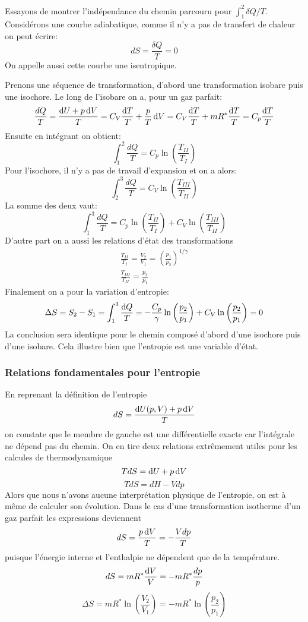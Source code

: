 Essayons de montrer l'indépendance du chemin parcouru
pour $\int_1^2 \delta Q/T$.
Considérons une courbe adiabatique,
comme il n'y a pas de transfert de chaleur on peut écrire:
\[ dS = \frac{\delta Q}{T} = 0 \]
On appelle aussi cette courbe une isentropique.

Prenons une séquence de transformation,
d'abord une transformation isobare puis une isochore.
Le long de l'isobare on a, pour un gaz parfait:
\[ \frac{dQ}{T} = \frac{\operatorname{d}\! U+p\operatorname{d}\! V}{T} =
C_V \frac{\operatorname{d}\! T}{T}+\frac pT\operatorname{d}\! V =
C_V \frac{\operatorname{d}\! T}T+mR^*\frac{\operatorname{d}\! T}T = C_p\frac{\operatorname{d}\! T}T \]
Ensuite en intégrant on obtient:
\[ \int_1^2 \frac{dQ}T = C_p \ln \left (\frac{T_{II}}{T_{I}}\right) \]
Pour l'isochore, il n'y a pas de travail d'expansion et on a alors:
\[ \int_2^3 \frac{dQ}T = C_V \ln \left (\frac{T_{III}}{T_{II}}\right) \]
La somme des deux vaut:
\[ \int_1^3 \frac{dQ}T = C_p \ln \left (\frac{T_{II}}{T_{I}}\right)+
C_V \ln \left (\frac{T_{III}}{T_{II}}\right) \]
D'autre part on a aussi les relations d'état des transformations
\begin{align*}
  \frac{T_{II}}{T_I} = \frac{V_2}{V_1} =
  \left(\frac{p_1}{p_2}\right)^{1/\gamma}\\
  \frac{T_{III}}{T_{II}} = \frac {p_2}{p_1}
\end{align*}
Finalement on a pour la variation d'entropie:
\[ \Delta S = S_2-S_1 = \int_1^3 \frac{\operatorname{d}\! Q}T =
-\frac{C_p}{\gamma} \ln \left(\frac{p_2}{p_1}\right) +
C_V \ln \left (\frac{p_2}{p_1}\right) = 0 \]
La conclusion sera identique pour le chemin composé d'abord
d'une isochore puis d'une isobare.
Cela illustre bien que l'entropie est une variable d'état.

\subsubsection{Relations fondamentales pour l'entropie}
En reprenant la définition de l'entropie
\[ dS = \frac{\operatorname{d}\! U(p,V)+p\operatorname{d}\! V}{T} \]
on constate que le membre de gauche est une différentielle exacte
car l'intégrale ne dépend pas du chemin.
On en tire deux relations extrêmement utiles
pour les calcules de thermodynamique
\[ TdS = \operatorname{d}\! U+p\operatorname{d}\! V \]
\[ TdS = dH-Vdp \]
Alors que nous n'avons aucune interprétation physique de l'entropie,
on est à même de calculer son évolution.
Dans le cas d'une transformation isotherme
d'un gaz parfait les expressions deviennent
\[ dS = \frac{p\operatorname{d}\! V}{T} = -\frac{Vdp}{T} \]
puisque l'énergie interne et l'enthalpie ne dépendent que de la température.
\[ dS = mR^*\frac{\operatorname{d}\! V}{V} = -mR^*\frac{dp}p \]
\[ \Delta S = mR^* \ln \left(\frac{V_2}{V_1}\right) =
-mR^* \ln \left(\frac{p_2}{p_1}\right) \]

